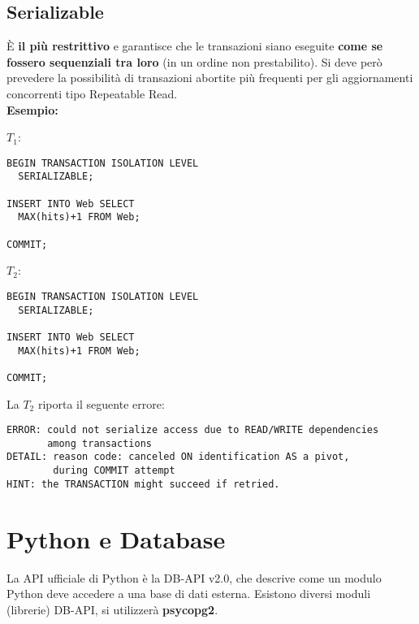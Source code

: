 \documentclass[a4paper, 10pt, titlepage]{article}
\begin{document}
	\subsection{Serializable}
		È \textbf{il più restrittivo} e garantisce che le transazioni siano eseguite \textbf{come se fossero sequenziali tra loro} (in un ordine non prestabilito). Si deve però prevedere la possibilità di transazioni abortite più frequenti per gli aggiornamenti concorrenti tipo Repeatable Read.\medskip \\
		\textbf{Esempio:}
		\begin{multicols}{2}
		\noindent
		$ T_1 $:
		\begin{lstlisting}
BEGIN TRANSACTION ISOLATION LEVEL
  SERIALIZABLE;
  
INSERT INTO Web SELECT
  MAX(hits)+1 FROM Web;

COMMIT;
		\end{lstlisting}
		\columnbreak
		$ T_2 $:
		\begin{lstlisting}
BEGIN TRANSACTION ISOLATION LEVEL
  SERIALIZABLE;

INSERT INTO Web SELECT
  MAX(hits)+1 FROM Web;

COMMIT;
		\end{lstlisting}
		\end{multicols}
		
		La $ T_2 $ riporta il seguente errore:
		\begin{lstlisting}
ERROR: could not serialize access due to READ/WRITE dependencies 
       among transactions
DETAIL: reason code: canceled ON identification AS a pivot, 
        during COMMIT attempt
HINT: the TRANSACTION might succeed if retried.
		\end{lstlisting}
	
	\newpage
	
\section{Python e Database}
	La API ufficiale di Python è la DB-API v2.0, che descrive come un modulo Python deve accedere a una base di dati esterna. Esistono diversi moduli (librerie) DB-API, si utilizzerà \textbf{psycopg2}.
\end{document}
